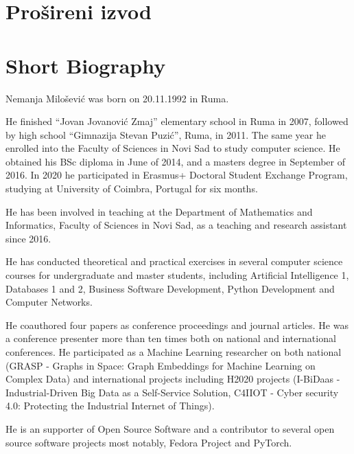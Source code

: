 \documentclass[b5paper]{book}
\newcommand{\skica}[1]{
    \noindent \framebox{\parbox[c]{0.9\textwidth}{  {\small** {#1}  }}
    \newline }
}
\begin{document}

{
  \raggedright
  \printbibliography[heading=bibintoc]
}


\chapter{Prošireni izvod}




\chapter{Short Biography}


Nemanja Milošević was born on 20.11.1992 in Ruma.

He finished ``Jovan Jovanović Zmaj'' elementary school in Ruma in 2007,
followed by high school ``Gimnazija Stevan Puzić'', Ruma, in 2011. The same year he enrolled into the Faculty of Sciences in Novi Sad to study computer science. He obtained his BSc diploma in June of 2014, and a masters degree in September of 2016. In 2020 he participated in Erasmus+ Doctoral Student Exchange Program, studying at University of Coimbra, Portugal for six months.

He has been involved in teaching at the Department of Mathematics and
Informatics, Faculty of Sciences in Novi Sad, as a teaching and research assistant since 2016.

He has conducted theoretical and practical exercises in several
computer science courses for undergraduate and master students,
including Artificial Intelligence 1, Databases 1 and 2, Business Software Development, Python Development and Computer Networks.

He coauthored four papers as conference proceedings and
journal articles. He was a conference presenter more than ten times both on national and international conferences. He participated as a Machine Learning researcher on both national (GRASP - Graphs in Space: Graph Embeddings for Machine Learning on Complex Data) and international projects including H2020 projects (I-BiDaas - Industrial-Driven Big Data as a Self-Service Solution, C4IIOT - Cyber security 4.0: Protecting the Industrial Internet of Things).

He is an supporter of Open Source Software and a contributor to several open source software projects most notably, Fedora Project and PyTorch.
\end{document}
